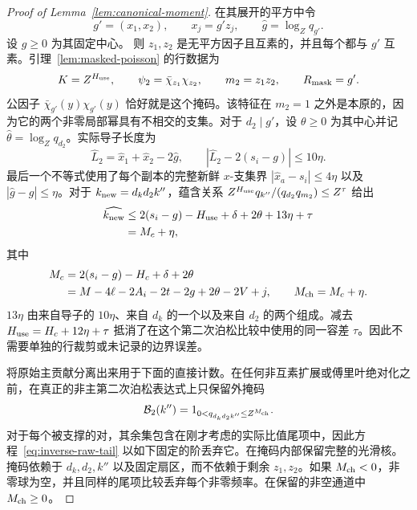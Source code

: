 \documentclass[11pt,a4paper]{article}
\numberwithin{equation}{section}
\numberwithin{figure}{section}
\theoremstyle{definition}
\theoremstyle{remark}
\begin{document}
\begin{proof}[Proof of Lemma~\ref{lem:canonical-moment}]
在其展开的平方中令
\[
 g'=(x_1,x_2),\qquad x_j=g'z_j,\qquad
 \widehat g=\log_Zq_{g'}.
\]
设 \(g\ge0\) 为其固定中心。
则 \(z_1,z_2\) 是无平方因子且互素的，并且每个都与 \(g'\) 互素。引理~\ref{lem:masked-poisson} 的行数据为
\begin{equation}\label{eq:second-masked-data}
 K=Z^{H_{\rm use}},\qquad
 \psi_2=\bar\chi_{z_1}\chi_{z_2},\qquad
 m_2=z_1z_2,\qquad R_{\rm mask}=g'.
\end{equation}
公因子 \(\bar\chi_{g'}(y)\chi_{g'}(y)\) 恰好就是这个掩码。该特征在 \(m_2=1\) 之外是本原的，因为它的两个非零局部幂具有不相交的支集。对于 \(d_2\mid g'\)，设 \(\theta\ge0\) 为其中心并记
\(\widehat\theta=\log_Zq_{d_2}\)。实际导子长度为
\[
 \widehat L_2=\widehat x_1+\widehat x_2-2\widehat g,
 \qquad |\widehat L_2-2(s_i-g)|\le10\eta.
\]
最后一个不等式使用了每个副本的完整新鲜 \(x\)-支集界
\(|\widehat x_a-s_i|\le4\eta\) 以及
\(|\widehat g-g|\le\eta\)。对于 \(k_{\rm new}=d_kd_2k''\)，蕴含关系
\(Z^{H_{\rm use}}q_{k''}/(q_{d_2}q_{m_2})\le Z^\tau\) 给出
\[
 \begin{split}
 \widehat{k_{\rm new}}
 &\le2(s_i-g)-H_{\rm use}+\delta+2\theta+13\eta+\tau\\
 &=M_c+\eta,
 \end{split}
\]
其中
\begin{equation}\label{eq:second-poisson-lengths}
 \begin{split}
 M_c&=2(s_i-g)-H_c+\delta+2\theta\\
    &=M-4\ell-2A_i-2t-2g+2\theta-2V+j,\qquad
 M_{\rm ch}=M_c+\eta.
 \end{split}
\end{equation}
\(13\eta\) 由来自导子的 \(10\eta\)、来自 \(d_k\) 的一个以及来自 \(d_2\) 的两个组成。减去
\(H_{\rm use}=H_c+12\eta+\tau\) 抵消了在这个第二次泊松比较中使用的同一容差 \(\tau\)。因此不需要单独的行裁剪或未记录的边界误差。

将原始主贡献分离出来用于下面的直接计数。在任何非互素扩展或傅里叶绝对化之前，在真正的非主第二次泊松表达式上只保留外掩码
\[
 \mathcal B_2(k'')=1_{0<q_{d_kd_2k''}\le Z^{M_{\rm ch}}}.
\]
对于每个被支撑的对，其余集包含在刚才考虑的实际比值尾项中，因此方程~\eqref{eq:inverse-raw-tail} 以如下固定的阶丢弃它。在掩码内部保留完整的光滑核。掩码依赖于 \(d_k,d_2,k''\) 以及固定扇区，而不依赖于剩余 \(z_1,z_2\)。如果 \(M_{\rm ch}<0\)，非零球为空，并且同样的尾项比较丢弃每个非零频率。在保留的非空通道中 \(M_{\rm ch}\ge0\)。


\end{proof}
\end{document}
